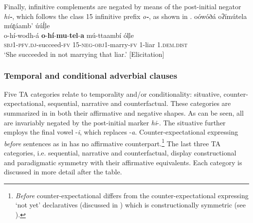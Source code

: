 \documentclass[output=paper,colorlinks=true, citecolor=brown,draftmode]{langscibook}
\begin{document}
Finally, infinitive complements are negated by means of the post-initial negator \textit{hi}\textbf{\textit{{}-}}, which follows the class 15 infinitive prefix \textit{o}\textbf{\textit{{}-}}, as shown in .
\newpage
\ea\label{ex:cuw:39} oówóðá oʔímútela múʈáamb’ úúĺ̩le  \\ 
    \gll  o-hí-wodh-á \textbf{o}{}-\textbf{hí}{}-\textbf{mu}{}-\textbf{tel}{}-\textbf{a} mú-ttaambí ól̩le \\
        \textsc{sbj1-pfv.dj}{}-succeed-\textsc{fv} \textsc{15-neg}{}-\textsc{obj}1-marry-\textsc{fv} 1-liar 1.\textsc{dem.dist}  \\
    \glt ‘She succeeded in not marrying that liar.’ [Elicitation]
\z 

\subsubsection{Temporal and conditional adverbial clauses}\label{sec:cuw:2.4.2}
Five TA categories relate to temporality and/or conditionality: situative, counter-expectational, sequential, narrative and counterfactual. These categories are summarized in  in both their affirmative and negative shapes. As can be seen, all are invariably negated by the post-initial marker \textit{hi}{}-. The situative further employs the final vowel -\textit{i}, which replaces -\textit{a}. Counter-expectational expressing \textit{before} sentences as in  has no affirmative counterpart.\footnote{\textit{Before} counter-expectational differs from the counter-expectational expressing ‘not yet’ declaratives (discussed in ) which is constructionally symmetric (see ).} The last three TA categories, i.e. sequential, narrative and counterfactual, display constructional and paradigmatic symmetry with their affirmative equivalents. Each category is discussed in more detail after the table.
\end{document}
